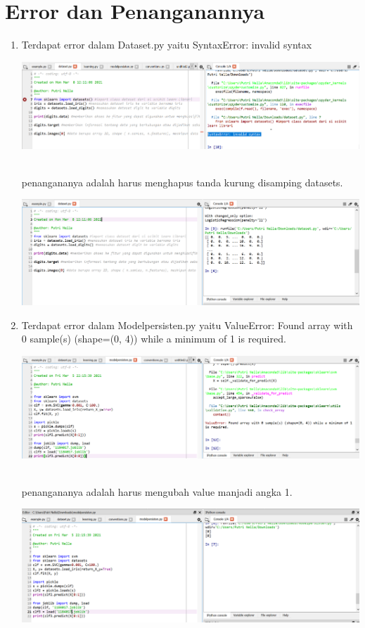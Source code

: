 \section{Error dan Penanganannya}
\begin{enumerate}
    \item Terdapat error dalam Dataset.py yaitu SyntaxError: invalid syntax
      \begin{center}
    \includegraphics[width=.8\textwidth]{figures/1184017/chapter1/error1.PNG}
    \end{center}
    \\
    penangananya adalah harus menghapus tanda kurung disamping datasets.
     \begin{center}
    \includegraphics[width=.8\textwidth]{figures/1184017/chapter1/3.PNG}
    \end{center}
    \item Terdapat error dalam Modelpersisten.py yaitu ValueError: Found array with 0 sample(s) (shape=(0, 4)) while a minimum of 1 is required.
      \begin{center}
    \includegraphics[width=.8\textwidth]{figures/1184017/chapter1/error2.PNG}
    \end{center}
    \\penangananya adalah harus mengubah value manjadi angka 1.
     \begin{center}
    \includegraphics[width=.8\textwidth]{figures/1184017/chapter1/5.PNG}
    \end{center}

\end{enumerate}

